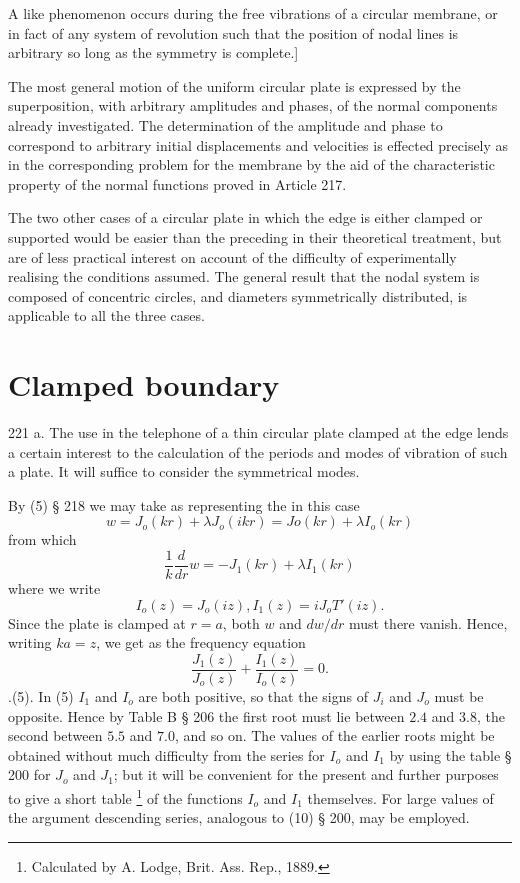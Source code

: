 A like phenomenon occurs during the free vibrations of a
circular membrane, or in fact of any system of revolution such
that the position of nodal lines is arbitrary so long as the
symmetry is complete.]

The most general motion of the uniform circular plate is expressed by
the superposition, with arbitrary amplitudes and phases, of the normal
components already investigated. The determination of the amplitude and
phase to correspond to arbitrary initial displacements and velocities is
effected precisely as in the corresponding problem for the membrane by
the aid of the characteristic property of the normal functions proved in
Article 217.

The two other cases of a circular plate in which the edge is either
clamped or supported would be easier than the preceding in their
theoretical treatment, but are of less practical interest on account of
the difficulty of experimentally realising the conditions assumed. The
general result that the nodal system is composed of concentric circles,
and diameters symmetrically distributed, is applicable to all the three
cases.

\section{Clamped boundary}\label{sect:221a}
221 a.
The use in the telephone of a thin circular plate clamped at the
edge lends a certain interest to the calculation of the periods and
modes of vibration of such a plate. It will suffice to consider the
symmetrical modes.

By (5) § 218 we may take as representing the in this case
\[ w = J_o (kr) + \lambda J_o(ikr)  = Jo (kr) + \lambda I_o(kr) \]
from which
\[ \frac{1}{k} \frac{d}{dr} w = -J_1 (kr) + \lambda I_1(kr)\]
where we write
\[ I_o(z) = J_o(iz), I_1(z) = i J_oT{\prime}(iz).\]
Since the plate is clamped at \(r = a\), both \(w\) and \(dw/dr\) must
there vanish. Hence, writing \(ka = z\), we get as the frequency equation
\[ \frac{J_1(z)}{J_o(z)} + \frac{I_1(z)}{I_o(z)} = 0.\]
.(5). In (5) \(I_1\) and \(I_o\) are both positive,
so that the signs of \(J_i\) and \(J_o\)
must be opposite. Hence by Table B § 206 the first root must lie
between \(2.4\) and \(3.8\), the second between \(5.5\) and \(7.0\), and
so on. The values of the earlier roots might be obtained without
much difficulty from the series for \(I_o\) and \(I_1\)
by using the table § 200 for \(J_o\) and \(J_1\); but
it will be convenient for the present and further purposes to give a
short table \footnote{Calculated by A. Lodge, Brit. Ass. Rep., 1889.}
of the functions \(I_o\) and \(I_1\)
themselves. For large values of the argument descending series,
analogous to (10) § 200, may be employed.

